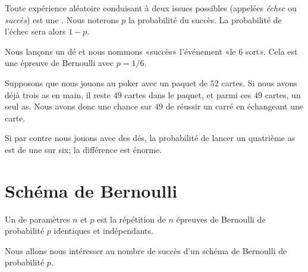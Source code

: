 \begin{definition}
    Toute expérience aléatoire conduisant à deux issues possibles (appelées \emph{échec} ou \emph{succès}) est une . Nous noterons \( p\) la probabilité du succès. La probabilité de l'échec sera alors \( 1-p\).
\end{definition}

\begin{example}
    Nous lançons un dé et nous nommons «succès» l'événement «le \( 6\) sort». Cela est une épreuve de Bernoulli avec \( p=1/6\).
\end{example}


\begin{example}
    Supposons que nous jouons au poker avec un paquet de \( 52\) cartes. Si nous avons déjà trois as en main, il reste \( 49\) cartes dans le paquet, et parmi ces \( 49\) cartes, un seul as. Nous avons donc une chance sur \( 49\) de réussir un carré en échangeant une carte.

    Si par contre nous jouons avec des dés, la probabilité de lancer un quatrième as est de une sur six; la différence est énorme.
\end{example}

\section{Schéma de Bernoulli}

\begin{definition}
    Un  de paramètres \( n\) et \( p\) est la répétition de \( n\) épreuves de Bernoulli de probabilité \( p\) identiques et indépendants.
\end{definition}
Nous allons nous intéresser au nombre de succès d'un schéma de Bernoulli de probabilité \( p\).

